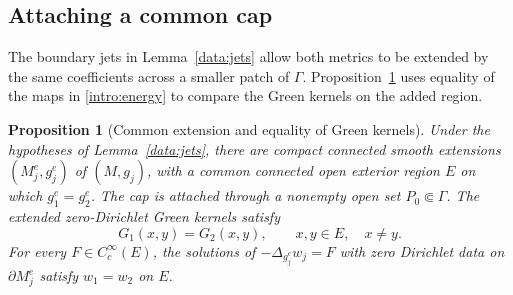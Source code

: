 \documentclass[11pt,a4paper]{article}
\newtheorem{proposition}[theorem]{Proposition}
\theoremstyle{definition}
\theoremstyle{remark}
\numberwithin{equation}{section}
\begin{document}
\subsection{Attaching a common cap}

The boundary jets in Lemma~\ref{data:jets} allow both metrics to be
extended by the same coefficients across a smaller patch of $\Gamma$.
Proposition~\ref{data:cap} uses equality of the maps in
\eqref{intro:energy} to compare the Green kernels on the added region.

\begin{proposition}[Common extension and equality of Green kernels]\label{data:cap}
Under the hypotheses of Lemma~\ref{data:jets}, there are compact
connected smooth extensions $(M_j^e,g_j^e)$ of $(M,g_j)$, with a
common connected open exterior region $E$ on which $g_1^e=g_2^e$. The cap is attached through a nonempty open set
$P_0\Subset\Gamma$. The extended zero-Dirichlet Green kernels satisfy
\[
 G_1(x,y)=G_2(x,y),\qquad x,y\in E,\quad x\ne y.
\]
For every $F\in C_c^\infty(E)$, the solutions of
$-\Delta_{g_j^e}w_j=F$ with zero Dirichlet data on $\partial M_j^e$
satisfy $w_1=w_2$ on $E$.
\end{proposition}
\end{document}
